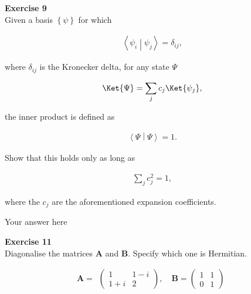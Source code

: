 \documentclass{article}
\begin{document}
\begin{mdframed}
\textbf{Exercise 9}\\
Given a basis $\left\{\psi\right\}$ for which

\begin{equation}
\begin{aligned}
     \left<\psi_i\middle|\psi_j\right> = \delta_{ij},
     \end{aligned}
\end{equation}

where $\delta_{ij}$ is the Kronecker delta, for any  state $\Psi$

\begin{equation}
\begin{aligned}
     \Ket{\Psi} = \sum_j c_j\Ket{\psi_j},
     \end{aligned}
\end{equation}

the inner product is defined as

\begin{equation}
\begin{aligned}
     \left<\Psi\middle|\Psi\right> = 1.
     \end{aligned}
\end{equation}

Show that this holds only as long as

\begin{equation}
\begin{aligned}
     \sum_j c_j^2 = 1,
     \end{aligned}
\end{equation}

where the $c_j$ are the aforementioned expansion coefficients.
\end{mdframed}

Your answer here

\begin{mdframed}
\textbf{Exercise 11}\\
Diagonalise the matrices $\mathbf{A}$ and $\mathbf{B}$. Specify which one is Hermitian.

\begin{equation}
\mathbf{A}=\begin{aligned}
     \left(\begin{matrix}
     1 & 1-i \\ 1+i & 2
     \end{matrix}\right)
     , \quad
     \mathbf{B} =\left(\begin{matrix}
     1 & 1 \\ 0 & 1
     \end{matrix}\right)
     \end{aligned}
\end{equation}
\end{mdframed}
\end{document}
